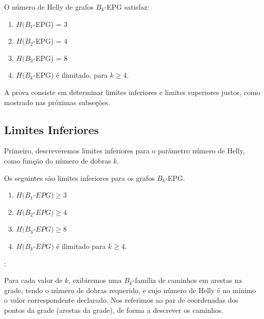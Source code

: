\begin{theorem}\label{thm:Helly-EPG}
O número de Helly de grafos $B_k$-EPG satisfaz:
\begin{enumerate}[nosep,label=\emph{(\roman*)}]
\item  $H(B_1$-EPG) = 3 
\item $H(B_2$-EPG)  = 4 
\item $H(B_3$-EPG)  = 8 
\item $H(B_k$-EPG) é ilimitado, para 
$k \geq 4$.
\end{enumerate}

\end{theorem}

A prova consiste em determinar limites inferiores e limites superiores justos, como mostrado nas próximas subseções.

\subsection{Limites Inferiores}

Primeiro, descreveremos limites inferiores para o parâmetro número de Helly, como função do número de dobras $k$.

\begin{lema}\label{claim:lower-Bk-EPG} 
Os seguintes são limites inferiores para os grafos  $B_k$-EPG.
\begin{enumerate}[nosep,label=\emph{(\roman*)}]
\item   $H(B_1$-$EPG) \geq 3$ 
\item $H(B_2$-$EPG) \geq 4$ 
\item $H(B_3$-$EPG) \geq 8$ 
\item $H(B_k$-$EPG )$ é ilimitado para  $k \geq 4$.
\end{enumerate}
\end{lema}

\proof:

Para cada valor de  $k$, exibiremos uma $B_k$-família de caminhos em arestas na grade, tendo o número de dobras requerido, e cujo número de Helly é no mínimo o valor correspondente declarado. Nos referimos ao par de coordenadas dos pontos da grade (arestas da grade), de forma a descrever os caminhos.

